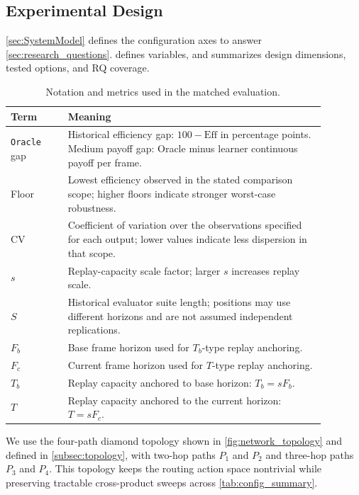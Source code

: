 
\subsection{Experimental Design}
\label{sec:expDesign}

\cref{sec:SystemModel} defines the configuration axes to answer \cref{sec:research_questions}.  defines variables, and  summarizes design dimensions, tested options, and RQ coverage.

\begin{table}[ht!]
\footnotesize
\centering
\setlength{\tabcolsep}{4pt}
\caption{Notation and metrics used in the matched evaluation.}
\label{tab:notation_metrics}
\begin{tabular}{p{0.16\linewidth} p{0.72\linewidth}}
\toprule
\textbf{Term} & \textbf{Meaning} \\
\midrule
\texttt{Oracle} gap & Historical efficiency gap: $100-\mathrm{Eff}$ in percentage points. Medium payoff gap: Oracle minus learner continuous payoff per frame. \\
Floor & Lowest efficiency observed in the stated comparison scope; higher floors indicate stronger worst-case robustness. \\
CV & Coefficient of variation over the observations specified for each output; lower values indicate less dispersion in that scope. \\
$s$ & Replay-capacity scale factor; larger $s$ increases replay scale. \\
$S$ & Historical evaluator suite length; positions may use different horizons and are not assumed independent replications. \\
$F_b$ & Base frame horizon used for $T_b$-type replay anchoring. \\
$F_c$ & Current frame horizon used for $T$-type replay anchoring. \\
$T_b$ & Replay capacity anchored to base horizon: $T_b=sF_b$.\\
$T$ & Replay capacity anchored to the current horizon: $T=sF_c$. \\
\bottomrule
\end{tabular}
\end{table}

We use the four-path diamond topology shown in \cref{fig:network_topology} and defined in \cref{subsec:topology}, with two-hop paths $P_1$ and $P_2$ and three-hop paths $P_3$ and $P_4$. This topology keeps the routing action space nontrivial while preserving tractable cross-product sweeps across \cref{tab:config_summary}.

